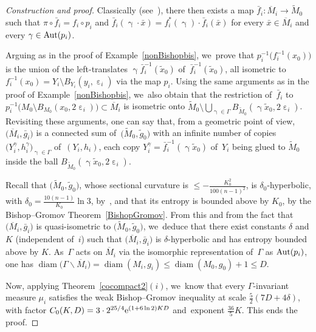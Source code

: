 \documentclass[10pt,a4paper]{amsart}
\numberwithin{equation}{section}
\newcommand{\f}{\rightarrow}
\newcommand{\diam}{\operatorname{diam}}
\newcommand{\g}{\operatorname{\gamma}}
\newcommand{\e}{\operatorname{\varepsilon}}
\begin{document}
\begin{proof}[Construction and proof]
Classically (see~\cite[Theorem~(6.1)]{GrH}), there then exists a map $\bar f_i \colon \overline M_i \f \widetilde M_0$ such that $\pi \circ \bar f_i =
f_i \circ p_i$
and $ \bar f_i (\g\cdot \bar x) = f_i^* (\g) \cdot \bar f_i (\bar x)$ for every $\bar x \in \overline M_i$ and every $\g \in {\rm Aut} (p_i)$.

Arguing as in the proof of Example~\ref{nonBishopbis}, we~prove that $p_i^{-1} \big( f_i^{-1} (x_0)\big)$ is the union of the left-translates
$ \g \bar f_i^{-1} ( \tilde x_0) $ of~$\bar f_i^{-1} ( \tilde x_0) $, all
isometric to $ f_i^{-1} (x_0) = Y_i \setminus B_{Y_i} (y_i, \e_i) $ via the map $p_i$.
Using the same arguments as in the proof of Example~\ref{nonBishopbis}, we~also obtain that the restriction of~$\bar f_i$ to
$p_i^{-1} \big( M_0 \setminus B_{M_0} (x_0, 2 \e_i)\big) \subset \overline M_i$ is isometric onto $\widetilde M_0 \setminus \bigcup_{\g \in \Gamma} B_{\widetilde M_0} (\g \tilde x_0, 2 \e_i)$.
Revisiting these arguments, one can say that, from a geometric point of view, $\big(\overline M_i, \bar g_i\big)$ is a connected sum of~$\big(\widetilde M_0, \tilde g_0\big)$ with an infinite
number of copies $\big(Y_i^\gamma, h_i^\gamma\big)_{\g \in \Gamma}$ of~$(Y_i, h_i)$, each copy $Y_i^\gamma = \bar f_i^{-1} (\g \tilde x_0) $ of~$Y_i$ being glued
to $\widetilde M_0$ inside
the ball $B_{\widetilde M_0} (\g \tilde x_0, 2 \e_i)$.

Recall that $\big(\widetilde M_0, \tilde g_0\big)$, whose sectional curvature is $\le - \frac{K_0^2}{100 (n-1)^2}$, is $\delta_0$-hyperbolic, with $\delta_0 =
\frac{10 (n-1)}{K_0} \ln 3 $, by~\cite[Proposition~1.4.3, p.~12]{CDP}, and that its entropy is bounded above by $K_0$, by the Bishop--Gromov Theorem~\ref{BishopGromov}. From this and from the fact that $\big(\overline M_i, \bar g_i\big)$ is quasi-isometric to $\big(\widetilde M_0, \tilde g_0\big)$, we~deduce that
there exist constants $\delta$ and $K$ (independent of~$i$) such that $\big(\overline M_i, \bar g_i\big)$ is $\delta$-hyperbolic and has entropy bounded
above by $K$. As~$\Gamma$ acts on $\overline M_i$ via the isomorphic representation of~$\Gamma$ as ${\rm Aut} (p_i)$, one has
$\diam \big(\Gamma \backslash \overline M_i\big) = \diam (M_i,g_i) \le \diam (M_0, g_0) + 1 \le D $.

Now, applying Theorem~\ref{cocompact2}$(i)$, we~know that every $\Gamma$-invariant measure $\mu_i$ satisfies the
weak Bishop--Gromov inequality at scale $\frac{5}{2} (7 D + 4 \delta)$, with factor $ C_0 (K, D) = 3\cdot 2^{25/4} {\rm e}^{(1+ 6 \ln 2) K D}$ and~exponent
$\frac{36}{5} K$. This ends the proof.
\end{proof}
\end{document}
